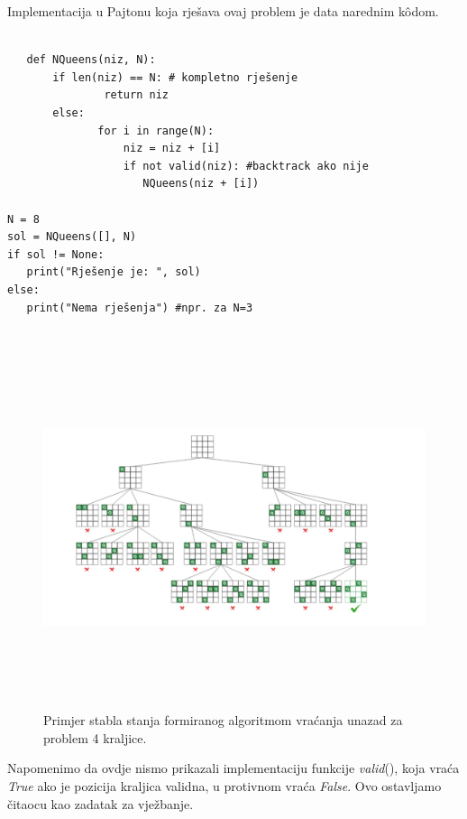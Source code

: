 \begin{solution}
   
Implementacija u Pajtonu koja rješava ovaj problem je data narednim k\^odom. 

\begin{verbatim}
	
   def NQueens(niz, N):
       if len(niz) == N: # kompletno rješenje
               return niz
       else:
              for i in range(N):
                  niz = niz + [i]
                  if not valid(niz): #backtrack ako nije 
                     NQueens(niz + [i])

N = 8
sol = NQueens([], N)       
if sol != None:
   print("Rješenje je: ", sol)
else:
   print("Nema rješenja") #npr. za N=3
   
\end{verbatim}
\begin{figure}
	\centering
	\includegraphics[width=450pt, height=300pt]{slike/n-queen-backtracking.png} %
	\caption{Primjer stabla stanja formiranog algoritmom vraćanja unazad za problem 4 kraljice.\protect\footnotemark}
\end{figure}

Napomenimo da ovdje nismo prikazali implementaciju funkcije \textit{valid}(), koja vraća \textit{True} ako je pozicija kraljica  validna, u protivnom vraća \textit{False}. Ovo ostavljamo čitaocu kao zadatak za vježbanje. 


\end{solution}


